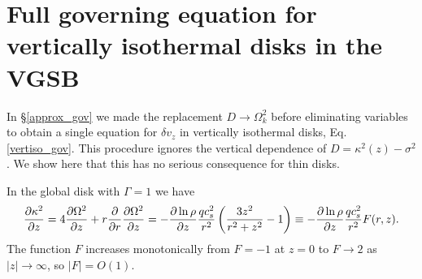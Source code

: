 \section{Full governing equation for vertically isothermal disks in
  the VGSB}\label{adia_improve}

In \S\ref{approx_gov} we made the replacement $D\to\Omega_k^2$ before
eliminating variables to obtain a single equation for $\delta v_z$ in
vertically isothermal disks, Eq. \ref{vertiso_gov}.  
This procedure ignores the vertical dependence of
$D=\kappa^2(z) - \sigma^2$. We show here that this has no serious 
consequence for thin disks. 

In the global disk with $\Gamma=1$ we have
\begin{align}\label{dkappa2}
  \frac{\partial\kappa^2}{\partial z} = 4 \frac{\partial\Omega^2}{\partial z} + r\frac{\partial}{\partial
    r}\frac{\partial\Omega^2}{\partial z} = -
   \frac{\partial\ln\rho}{\partial z}\frac{qc_s^2}{r^2} \left(
  \frac{3z^2}{r^2+z^2}-1\right) \equiv - \frac{\partial\ln\rho}{\partial z}\frac{qc_s^2}{r^2}F(r,z).
\end{align}
The function $F$ increases monotonically from $F=-1$ at $z=0$ to $F\to2$
as $|z|\to\infty $, so $|F|=O(1)$. 

